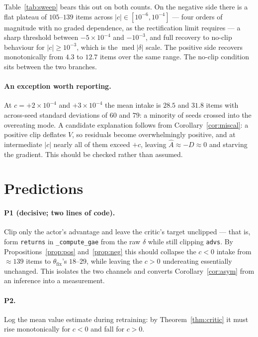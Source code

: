 \documentclass[11pt]{article}
\theoremstyle{definition}
\newcommand{\Ahat}{\hat A}
\begin{document}
Table~\ref{tab:sweep} bears this out on both counts. On the negative side
there is a flat plateau of $105$--$139$ items across
$|c|\in[10^{-6},10^{-4}]$ --- four orders of magnitude with no graded
dependence, as the rectification limit requires --- a sharp threshold between
$-5\times10^{-4}$ and $-10^{-3}$, and full recovery to no-clip behaviour for
$|c|\ge10^{-3}$, which is the $\operatorname{med}|\delta|$ scale. The positive
side recovers monotonically from $4.3$ to $12.7$ items over the same range.
The no-clip condition sits between the two branches.

\paragraph{An exception worth reporting.} At $c=+2\times10^{-4}$ and
$+3\times10^{-4}$ the mean intake is $28.5$ and $31.8$ items with across-seed
standard deviations of $60$ and $79$: a minority of seeds crossed into the
overeating mode. A candidate explanation follows from
Corollary~\ref{cor:miscal}: a positive clip deflates $V$, so residuals become
overwhelmingly positive, and at intermediate $|c|$ nearly all of them exceed
$+c$, leaving $\Ahat\approx-D\approx0$ and starving the gradient. This should
be checked rather than assumed.

\section{Predictions}
\label{sec:predictions}

\paragraph{P1 (decisive; two lines of code).} Clip only the actor's advantage
and leave the critic's target unclipped --- that is, form \texttt{returns} in
\texttt{\_compute\_gae} from the raw $\delta$ while still clipping
\texttt{advs}. By Propositions~\ref{prop:pos} and~\ref{prop:neg} this should
collapse the $c<0$ intake from $\approx139$ items to
$\theta_{\mathrm{fix}}$'s $18$--$29$, while leaving the $c>0$ undereating
essentially unchanged. This isolates the two channels and converts
Corollary~\ref{cor:asym} from an inference into a measurement.

\paragraph{P2.} Log the mean value estimate during retraining: by
Theorem~\ref{thm:critic} it must rise monotonically for $c<0$ and fall for
$c>0$.
\end{document}
